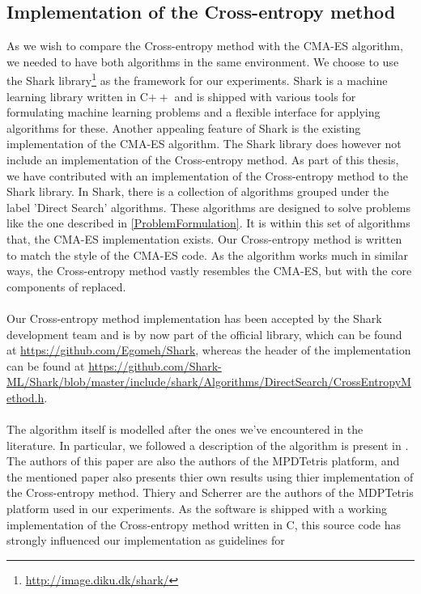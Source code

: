 \subsection{Implementation of the Cross-entropy method}

As we wish to compare the Cross-entropy method 
with the CMA-ES algorithm, we needed to have both algorithms
in the same environment. We choose to use the Shark 
library\footnote{\url{http://image.diku.dk/shark/}}
as the framework for our experiments. Shark is a machine 
learning library written in C$++$ and is shipped with various tools
for formulating machine learning problems and a flexible 
interface for applying algorithms for these. Another appealing
feature of Shark is the existing implementation of the CMA-ES algorithm.
The Shark library does however not include an implementation of
the Cross-entropy method. As part of this thesis, we have contributed with
an implementation of the Cross-entropy method to the Shark library.
In Shark, there is a collection of algorithms grouped under the label
'Direct Search' algorithms. These algorithms are designed to solve 
problems like the one described in \ref{ProblemFormulation}. It is within this set of algorithms that, 
the CMA-ES implementation exists. Our Cross-entropy method 
is written to match the style of the CMA-ES code. As the algorithm
works much in similar ways, the Cross-entropy method vastly resembles the CMA-ES, 
but with the core components of replaced.\\
\\
Our Cross-entropy method implementation has been accepted by the Shark development team and is 
by now part of the official library, which can be found at 
\url{https://github.com/Egomeh/Shark}, whereas the header of the 
implementation can be found at 
\url{https://github.com/Shark-ML/Shark/blob/master/include/shark/Algorithms/DirectSearch/CrossEntropyMethod.h}.\\
\\
The algorithm itself is modelled after the ones we've encountered 
in the literature. In particular, we followed a description of the algorithm is 
present in \citep{thiery:09}. The authors of this paper are also the authors of the MPDTetris
platform, and the mentioned paper also presents thier own results using thier implementation of
the Cross-entropy method. 
Thiery and Scherrer are the authors of the 
MDPTetris platform used in our experiments.  As the 
software is shipped with a working implementation of the Cross-entropy method written in C,
this source code has strongly influenced our implementation as guidelines for
